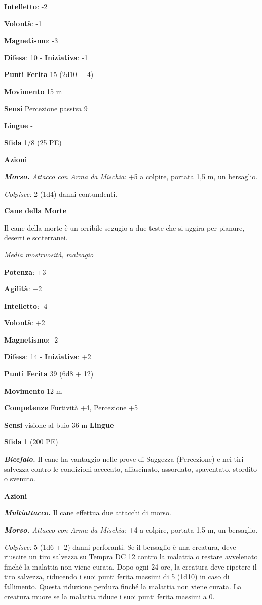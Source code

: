 \begin{multicols}{2}
\textbf{Intelletto}: -2

\textbf{Volontà}: -1

\textbf{Magnetismo}: -3

\textbf{Difesa}: 10 - \textbf{Iniziativa}: -1

\textbf{Punti Ferita} 15 (2d10 + 4)

\textbf{Movimento} 15 m

\textbf{Sensi} Percezione passiva 9

\textbf{Lingue} -

\textbf{Sfida} 1/8 (25 PE)

\textbf{Azioni}

\emph{\textbf{Morso.} Attacco con Arma da Mischia}: +5 a colpire,
portata 1,5 m, un bersaglio.

\emph{Colpisce:} 2 (1d4) danni contundenti.

\textbf{Cane della Morte}

Il cane della morte è un orribile segugio a due teste che si aggira per
pianure, deserti e sotterranei.

\emph{Media mostruosità, malvagio}

\textbf{Potenza}: +3

\textbf{Agilità}: +2

\textbf{Intelletto}: -4

\textbf{Volontà}: +2

\textbf{Magnetismo}: -2

\textbf{Difesa}: 14 - \textbf{Iniziativa}: +2

\textbf{Punti Ferita} 39 (6d8 + 12)

\textbf{Movimento} 12 m

\textbf{Competenze} Furtività +4, Percezione +5

\textbf{Sensi} visione al buio 36 m
\textbf{Lingue} -

\textbf{Sfida} 1 (200 PE)

\emph{\textbf{Bicefalo.}} Il cane ha vantaggio nelle prove di Saggezza
(Percezione) e nei tiri salvezza contro le condizioni accecato,
affascinato, assordato, spaventato, stordito o svenuto.

\textbf{Azioni}

\emph{\textbf{Multiattacco.}} Il cane effettua due attacchi di morso.

\emph{\textbf{Morso.} Attacco con Arma da Mischia}: +4 a colpire,
portata 1,5 m, un bersaglio.

\emph{Colpisce:} 5 (1d6 + 2) danni perforanti. Se il bersaglio è una
creatura, deve riuscire un tiro salvezza su Tempra DC 12 contro la
malattia o restare avvelenato finché la malattia non viene curata. Dopo
ogni 24 ore, la creatura deve ripetere il tiro salvezza, riducendo i
suoi punti ferita massimi di 5 (1d10) in caso di fallimento. Questa
riduzione perdura finché la malattia non viene curata. La creatura muore
se la malattia riduce i suoi punti ferita massimi a 0.


\end{multicols}

